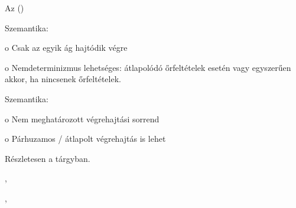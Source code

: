 \begin{megjegyzes}
	Az  ()
\end{megjegyzes}

\begin{definicio}
\end{definicio}



\begin{definicio}
\end{definicio}

\begin{definicio}
\end{definicio}


Szemantika:

o Csak az egyik ág hajtódik végre

o Nemdeterminizmus lehetséges: átlapolódó őrfeltételek esetén vagy egyszerűen akkor, ha nincsenek őrfeltételek.


Szemantika:

o Nem meghatározott végrehajtási sorrend

o Párhuzamos / átlapolt végrehajtás is lehet

Részletesen a \szgarch tárgyban.

\begin{definicio}
\end{definicio}


\begin{definicio}
	, 
\end{definicio}


\begin{definicio}
	, 
\end{definicio}



